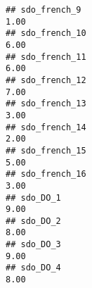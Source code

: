 \documentclass[
]{article}
\begin{document}
\begin{verbatim}
## sdo_french_9                                                                                                                                                                                                                 1.00
## sdo_french_10                                                                                                                                                                                                                6.00
## sdo_french_11                                                                                                                                                                                                                6.00
## sdo_french_12                                                                                                                                                                                                                7.00
## sdo_french_13                                                                                                                                                                                                                3.00
## sdo_french_14                                                                                                                                                                                                                2.00
## sdo_french_15                                                                                                                                                                                                                5.00
## sdo_french_16                                                                                                                                                                                                                3.00
## sdo_DO_1                                                                                                                                                                                                                     9.00
## sdo_DO_2                                                                                                                                                                                                                     8.00
## sdo_DO_3                                                                                                                                                                                                                     9.00
## sdo_DO_4                                                                                                                                                                                                                     8.00

\end{verbatim}
\end{document}

